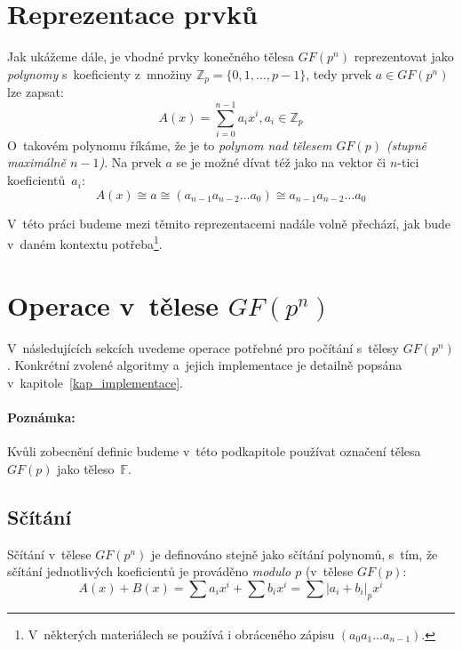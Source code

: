 \documentclass[thesis=M,czech,hidelinks]{FITthesis}[2012/06/26]
\newcommand{\0}{{\textcolor[gray]{0.75}{0}}}
\begin{document}
\section{Reprezentace prvků}

Jak ukážeme dále, je vhodné prvky konečného tělesa $GF(p^n)$ reprezentovat jako
\emph{polynomy} s~koeficienty z~množiny $\mathbb{Z}_p=\{0,1,\ldots,p-1\}$, tedy
prvek $a \in GF(p^n)$ lze zapsat:
$$
    A(x) = \sum_{i=0}^{n-1} a_i x^i, a_i \in \mathbb{Z}_p
$$
O~takovém polynomu říkáme, že je to \emph{polynom nad tělesem $GF(p)$ (stupně
maximálně $n-1$)}. Na prvek $a$ se je možné dívat též jako na vektor či $n$-tici
koeficientů~$a_i$:
$$
    A(x) \cong a \cong (a_{n-1} a_{n-2} \ldots a_0) \cong
    a_{n-1} a_{n-2} \ldots a_0
$$

V~této práci budeme mezi těmito reprezentacemi nadále volně přechází, jak bude
v~daném kontextu potřeba\footnote{
    V~některých materiálech se používá i obráceného zápisu
    $(a_0 a_1 \ldots a_{n-1})$.
}.



\section{Operace v~tělese $GF(p^n)$}

V~následujících sekcích uvedeme operace potřebné pro počítání s~tělesy
$GF(p^n)$. Konkrétní zvolené algoritmy a~jejich implementace je detailně popsána
v~kapitole~\ref{kap_implementace}.

\paragraph{Poznámka:} Kvůli zobecnění definic budeme v~této podkapitole používat
označení tělesa $GF(p)$ jako těleso~$\mathbb{F}$.


\subsection{Sčítání}

Sčítání v~tělese $GF(p^n)$ je definováno stejně jako sčítání polynomů, s~tím, že
sčítání jednotlivých koeficientů je prováděno \emph{modulo $p$} (v~tělese
$GF(p)$:
$$
    A(x) + B(x) = \sum a_i x^i + \sum b_i x^i =
    \sum \left|a_i + b_i\right|_p x^i
$$
\end{document}
